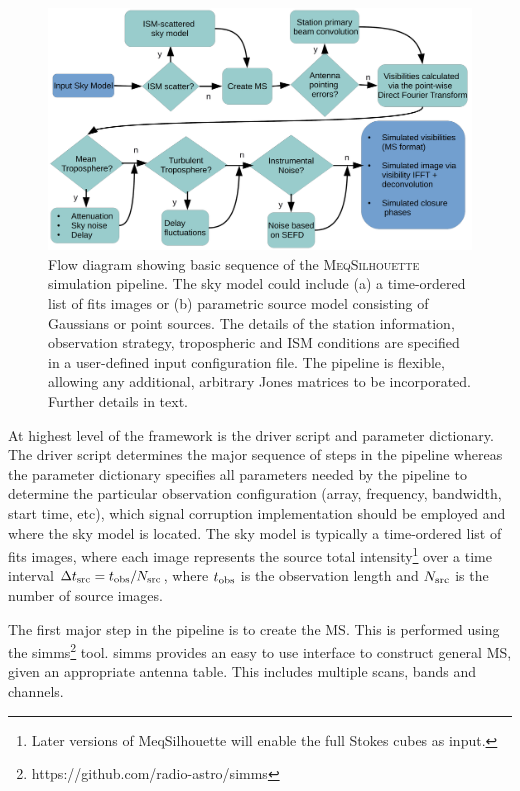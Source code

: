 \begin{figure}
\begin{center}
\includegraphics[width=\columnwidth]{Images/flow_full}
\caption{Flow diagram showing basic sequence of the \textsc{MeqSilhouette} simulation pipeline. The sky model could include (a) a time-ordered list of {\sc fits} images or (b) parametric source model consisting of Gaussians or point sources. The details of the station information, observation strategy, tropospheric and ISM conditions are specified in a user-defined input configuration file. The pipeline is flexible, allowing any additional, arbitrary Jones matrices to be incorporated. Further details in text.\label{flow}%
}
\end{center}
\end{figure}


At highest level of the framework is the driver script and parameter dictionary. The driver script determines the major sequence of steps in the pipeline whereas the parameter dictionary specifies all parameters needed by the pipeline to determine the particular observation configuration (array, frequency, bandwidth, start time, etc), which signal corruption implementation should be employed and where the sky model is located. The sky model is typically a time-ordered list of {\sc fits} images, where each image represents the source total intensity\footnote{Later versions of {\sc MeqSilhouette} will enable the full Stokes cubes as input.} over a time interval $\Delta t_{\rm src} = t_{\rm obs}/N_{\rm src}$, where $t_{\rm obs}$ is the observation length and $N_{\rm src}$ is the number of source images.


The first major step in the pipeline is to create the MS. This is performed using the {\sc simms}\footnote{https://github.com/radio-astro/simms} tool. {\sc simms} provides an easy to use interface to construct general MS, given an appropriate antenna table. This includes multiple scans, bands and channels. 

